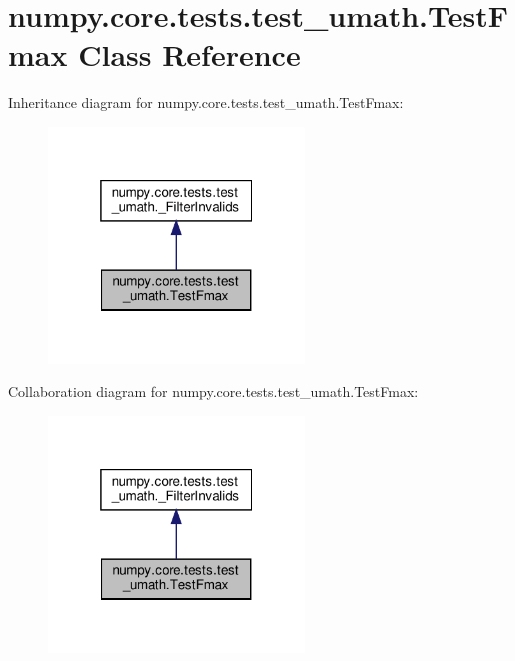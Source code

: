 \hypertarget{classnumpy_1_1core_1_1tests_1_1test__umath_1_1TestFmax}{}\section{numpy.\+core.\+tests.\+test\+\_\+umath.\+Test\+Fmax Class Reference}
\label{classnumpy_1_1core_1_1tests_1_1test__umath_1_1TestFmax}


Inheritance diagram for numpy.\+core.\+tests.\+test\+\_\+umath.\+Test\+Fmax\+:
\nopagebreak
\begin{figure}[H]
\begin{center}
\leavevmode
\includegraphics[width=193pt]{classnumpy_1_1core_1_1tests_1_1test__umath_1_1TestFmax__inherit__graph}
\end{center}
\end{figure}


Collaboration diagram for numpy.\+core.\+tests.\+test\+\_\+umath.\+Test\+Fmax\+:
\nopagebreak
\begin{figure}[H]
\begin{center}
\leavevmode
\includegraphics[width=193pt]{classnumpy_1_1core_1_1tests_1_1test__umath_1_1TestFmax__coll__graph}
\end{center}
\end{figure}
